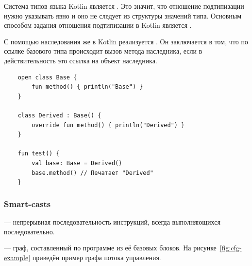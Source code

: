 Система типов языка Kotlin является .
Это значит, что отношение подтипизации нужно указывать явно и оно не следует из структуры значений типа.
Основным способом задания отношения подтипизации в Kotlin является .

С помощью наследования же в Kotlin реализуется .
Он заключается в том, что по ссылке базового типа происходит вызов метода наследника, если в действительность это ссылка на объект наследника.
\begin{verbatim}
    open class Base {
        fun method() { println("Base") }
    }

    class Derived : Base() {
        override fun method() { println("Derived") }
    }

    fun test() {
        val base: Base = Derived()
        base.method() // Печатает "Derived"
    }
\end{verbatim}

\subsubsection{Smart-casts}\label{subsubsec:smart-casts}

\begin{definition}
    \label{def:basic-block}
     --- непрерывная последовательность инструкций, всегда выполняющихся последовательно.
\end{definition}

\begin{definition}
    \label{def:cfg}
     --- граф, составленный по программе из её базовых блоков.
    На рисунке~\ref{fig:cfg-example} приведён пример графа потока управления.
\end{definition}

